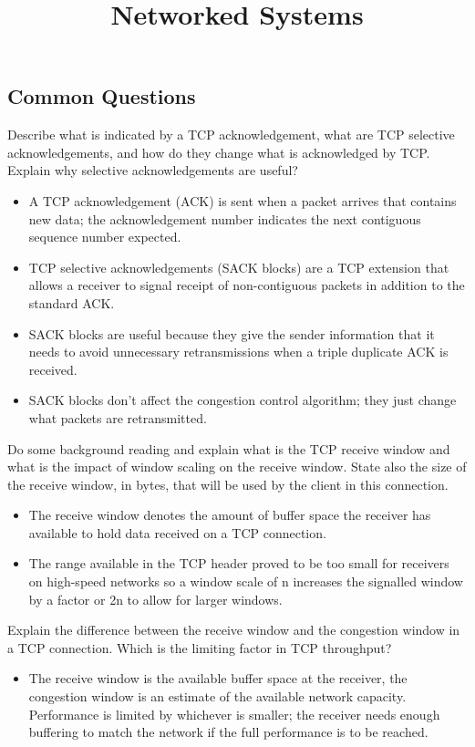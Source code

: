 \documentclass{article}
\title{Networked Systems}
\author{}
\date{}
\begin{document}
\footnotesize

\subsection*{Common Questions}
Describe what is indicated by a TCP acknowledgement, what are TCP selective acknowledgements, and how do they change what is acknowledged by TCP. Explain why selective acknowledgements are useful?
\begin{itemize}
    \item A TCP acknowledgement (ACK) is sent when a packet arrives that contains new data; the acknowledgement number indicates the next contiguous sequence number expected.
    \item TCP selective acknowledgements (SACK blocks) are a TCP extension that allows a receiver to signal receipt of non-contiguous packets in addition to the standard ACK.
    \item SACK blocks are useful because they give the sender information that it needs to avoid unnecessary retransmissions when a triple duplicate ACK is received.
    \item SACK blocks don’t affect the congestion control algorithm; they just change what packets are retransmitted.
\end{itemize}

\noindent Do some background reading and explain what is the TCP receive window and what is the impact of window scaling on the receive window. State also the size of the receive window, in bytes, that will be used by the client in this connection.
\begin{itemize}
    \item The receive window denotes the amount of buffer space the receiver has available to hold data received on a TCP connection.
    \item The range available in the TCP header proved to be too small for receivers on high-speed networks so a window scale of n increases the signalled window by a factor or 2n to allow for larger windows.
\end{itemize}

\noindent Explain the difference between the receive window and the congestion window in a TCP connection. Which is the limiting factor in TCP throughput?
\begin{itemize}
    \item The receive window is the available buffer space at the receiver, the congestion window is an estimate of the available network capacity. 
    Performance is limited by whichever is smaller; the receiver needs enough buffering to match the network if the full performance is to be reached.
\end{itemize}
\end{document}

